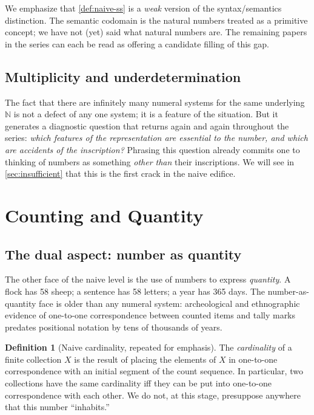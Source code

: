 \documentclass[12pt]{article}
\theoremstyle{definition}
\newtheorem{definition}[theorem]{Definition}
\theoremstyle{remark}
\begin{document}
We emphasize that \cref{def:naive-ss} is a \emph{weak} version of the
syntax/semantics distinction. The semantic codomain is the natural numbers
treated as a primitive concept; we have not (yet) said what natural numbers
are. The remaining papers in the series can each be read as offering a
candidate filling of this gap.

\subsection{Multiplicity and underdetermination}

The fact that there are infinitely many numeral systems for the same
underlying $\mathbb{N}$ is not a defect of any one system; it is a feature
of the situation. But it generates a diagnostic question that returns
again and again throughout the series: \emph{which features of the
representation are essential to the number, and which are accidents of
the inscription?} Phrasing this question already commits one to thinking
of numbers as something \emph{other than} their inscriptions. We will see
in \cref{sec:insufficient} that this is the first crack in the naive
edifice.

\section{Counting and Quantity}
\label{sec:counting-quantity}

\subsection{The dual aspect: number as quantity}

The other face of the naive level is the use of numbers to express
\emph{quantity}. A flock has 58 sheep; a sentence has 58 letters; a year
has 365 days. The number-as-quantity face is older than any numeral
system: archeological and ethnographic evidence of one-to-one correspondence
between counted items and tally marks predates positional notation by tens
of thousands of years.

\begin{definition}[Naive cardinality, repeated for emphasis]
\label{def:naive-cardinality}
The \emph{cardinality} of a finite collection $X$ is the result of placing
the elements of $X$ in one-to-one correspondence with an initial segment
of the count sequence. In particular, two collections have the same
cardinality iff they can be put into one-to-one correspondence with each
other. We do not, at this stage, presuppose anywhere that this number
``inhabits.''
\end{definition}
\end{document}
